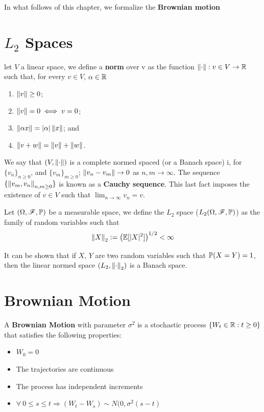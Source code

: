 \documentclass[../TGMAFFIRO]{subfiles}
\begin{document}
In what follows of this chapter, we formalize the \textbf{Brownian motion}
\section{$L_2$ Spaces}
\begin{definition}
	let $V$ a linear space, we define a \textbf{norm} over v as the function $\left\lVert\cdot\right\rVert: v \in V \to \mathbb{R}$ such that, for every $v\in V$, $\alpha \in \mathbb{R}$
	\begin{enumerate}
		\item $\left\lVert v\right\rVert\geq 0$;
		\item $\left\lVert v\right\rVert = 0 \iff v = 0$;
		\item $\left\lVert\alpha x\right\rVert = |\alpha| \left\lVert x\right\rVert$; and
		\item $\left\lVert v + w\right\rVert = \left\lVert v\right\rVert + \left\lVert w\right\rVert$.
	\end{enumerate}
\end{definition}	
We say that $(V, \left\lVert\cdot\right\rVert)$ is a complete normed spaced (or a Banach space) i, for $\{v_n\}_{n\geq 0}$, and $\{v_m\}_{m\geq 0}$; $\left\lVert v_n - v_m\right\rVert \to 0$ as $n, m \to \infty$. The sequence $\{\left\lVert v_m, v_n\right\rVert_{n,m \geq 0}\}$ is known as a \textbf{Cauchy sequence}. This last fact imposes the existence of $v\in V$ such that $\lim_{n\to\infty} v_n = v$.

\begin{definition}
Let $(\Omega, \mathscr{F}, \mathbb{P})$ be a measurable space, we define the $L_2$ space ($L_2(\Omega, \mathscr{F}, \mathbb{P})$) as the family of random variables such that
	\begin{equation}
		\left\lVert X\right\rVert_2:= \left(\mathbb{E}[|X|^2] \right)^{1/2} < \infty
	\end{equation}
	
\end{definition}

It can be shown that if $X$, $Y$ are two random variables such that $\mathbb{P}(X=Y) = 1$, then the linear normed space $(L_2, \left\lVert\cdot\right\rVert_2)$ is a Banach space.

\section{Brownian Motion}
\begin{definition}\label{def:brownian_motion}
	A \textbf{Brownian Motion} with parameter $\sigma^2$ is a stochastic process $\{W_t \in \mathbb{R}:t\geq 0\}$ that satisfies the following properties:
	\begin{itemize}
		\item $W_0 = 0$
		\item The trajectories are continuous
		\item The process has independent increments
		\item $\forall \ 0 \leq s \leq t \Longrightarrow (W_t - W_s) \sim N(0, \sigma^2(s - t)$
	\end{itemize}
\end{definition}
\end{document}
